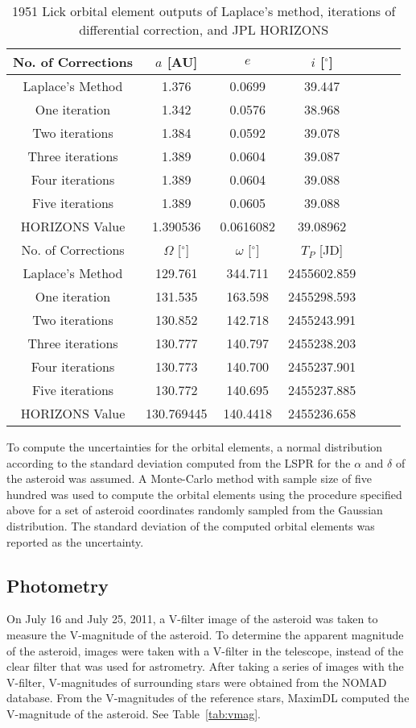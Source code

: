 \documentclass[12pt,journal,compsoc]{IEEEtran}
\begin{document}
\begin{table}[!t]
\centering
\begin{tabular}{|c|c|c|c|c|c|c|}
\hline
No. of Corrections & $a$ [AU]& $e$ & $i$ [$^\circ$] \\ \hline
Laplace's Method &1.376& 0.0699& 39.447 \\ \hline
One iteration &1.342& 0.0576& 38.968 \\ \hline
Two iterations &1.384& 0.0592& 39.078 \\ \hline
Three iterations &1.389& 0.0604& 39.087 \\ \hline
Four iterations &1.389& 0.0604& 39.088 \\ \hline
Five iterations &1.389& 0.0605& 39.088 \\ \hline
HORIZONS Value & 1.390536 & 0.0616082& 39.08962  \\ \hline \hline
No. of Corrections & $\Omega$ [$^\circ$] & $\omega$ [$^\circ$] & $T_P$ [JD]\\ \hline
Laplace's Method & 129.761& 344.711& 2455602.859\\ \hline
One iteration & 131.535& 163.598& 2455298.593\\ \hline
Two iterations & 130.852& 142.718& 2455243.991\\ \hline
Three iterations & 130.777& 140.797& 2455238.203\\ \hline
Four iterations & 130.773& 140.700& 2455237.901\\ \hline
Five iterations & 130.772& 140.695& 2455237.885\\ \hline 
HORIZONS Value & 130.769445 & 140.4418 & 2455236.658 \\ \hline
\end{tabular}
\caption{\label{tab:iterations} 1951 Lick orbital element outputs of Laplace's method, iterations of differential correction, and JPL HORIZONS}
\end{table}

To compute the uncertainties for the orbital elements, 
a normal distribution according to the standard deviation computed from the LSPR 
for the $\alpha$ and $\delta$ of the asteroid was assumed.
A Monte-Carlo method with sample size of five hundred was used to compute the orbital elements using the procedure 
specified above for a set of asteroid coordinates randomly sampled from the Gaussian distribution.
The standard deviation of the computed orbital elements was reported as the uncertainty.

\subsection{Photometry}
On July 16 and July 25, 2011, a V-filter image of the asteroid was taken to measure the V-magnitude of the asteroid.
To determine the apparent magnitude of the asteroid, images were taken with a V-filter in the telescope, 
instead of the clear filter that was used for astrometry.
After taking a series of images with the V-filter, V-magnitudes of surrounding stars were obtained from the NOMAD database.
From the V-magnitudes of the reference stars, MaximDL computed the V-magnitude of the asteroid. See Table~\ref{tab:vmag}.
\end{document}
